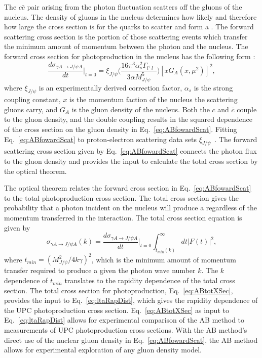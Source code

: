     The $c\bar{c}$ pair arising from the photon fluctuation scatters off the 
      gluons of the nucleus. 
    The density of gluons in the nucleus determines how likely and therefore 
      how large the cross section is for the quarks to scatter and form a 
      \JPsi{}.
    The forward scattering cross section is the portion of those scattering 
      events which transfer the minimum amount of momentum between the 
      photon and the nucleus. 
    The forward cross section for \JPsi{} photoproduction in the nucleus has 
      the following form \cite{pQCD2011.08}:
    \begin{equation} \label{eq:ABfowardScat}
      \frac{d\sigma_{\gamma A\rightarrow J/\psi A}}{dt}\Big|_{t=0}=\xi_{J/\psi}
        \Big(\frac{16\pi^{3}\alpha_{s}^{2}\Gamma_{l^{+}l^{-}}}{3\alpha 
        M_{J/\psi}^{5}}\Big)[xG_{A}(x,\mu^{2})]^{2},
    \end{equation}
      where $\xi_{J/\psi}$ is an experimentally derived 
      correction factor, $\alpha_{s}$ is the strong coupling constant, $x$ is 
      the momentum faction of the nucleus the scattering gluons carry, and 
      $G_{A}$ is the gluon density of the nucleus. 
    Both the $c$ and $\bar{c}$ couple to the gluon density, and the double 
      coupling results in the squared dependence of the cross section on the 
      gluon density in Eq.~\ref{eq:ABfowardScat}. 
    Fitting Eq.~\ref{eq:ABfowardScat} to proton-electron scattering data 
      sets $\xi_{J/\psi}$~\cite{pQCD2011.08}.
    The forward scattering cross section given by Eq.~\ref{eq:ABfowardScat} 
      connects the photon flux to the gluon density and provides the input to 
      calculate the total cross section by the optical theorem. 
    
    The optical theorem relates the forward cross section in 
      Eq.~\ref{eq:ABfowardScat} to the total photoproduction cross section. 
    The total cross section gives the probability that a photon incident on 
      the nucleus will produce a \JPsi{} regardless of the momentum transferred 
      in the interaction. 
    The total cross section equation is given by
    \begin{equation} \label{eq:ABtotXSec}
      \sigma_{\gamma A\rightarrow J/\psi A}(k)=
      \frac{d\sigma_{\gamma A\rightarrow J/\psi A}}{dt}\Big|_{t=0}
      \int_{t_{min}(k)}^{\infty}dt|F(t)|^{2},
    \end{equation} 
      where $t_{min}=(M_{J/\psi}^{2}/4k\gamma)^2$, which is the minimum 
      amount of momentum transfer required to produce a \JPsi{} 
      given the photon wave number $k$.
    The $k$ dependence of $t_{min}$ translates to the rapidity 
      dependence of the total cross section.
    The total cross section for photoproduction, Eq.~\ref{eq:ABtotXSec}, 
      provides the input to Eq.~\ref{eq:ltaRapDist}, 
      which gives the rapidity dependence of the UPC photoproduction cross 
      section. 
    Eq.~\ref{eq:ABtotXSec} as input to Eq.~\ref{eq:ltaRapDist} allows for 
      experimental comparison of the AB method to measurements of UPC 
      photoproduction cross sections. 
    With the AB method's direct use of the nuclear gluon density in 
      Eq.~\ref{eq:ABfowardScat}, the AB method allows for experimental 
      exploration of any gluon density model. 
      
